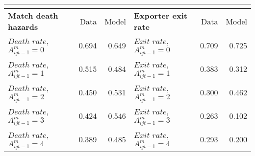 \documentclass[notes=show]{beamer}
\begin{document}
\begin{frame}%


\begin{center}
{\small 
\begin{tabular}{lrrlrr}
\multicolumn{6}{c}{} \\ \hline\hline
\textbf{Match death hazards}      & Data  & Model & \textbf{Exporter exit rate}       & Data  & Model \\ \hline
$Death$ $rate,$ $A_{ijt-1}^{m}=0$ & 0.694 & 0.649 & $Exit$ $rate,$ $ A_{ijt-1}^{m}=0$ & 0.709 & 0.725 \\
$Death$ $rate,$ $A_{ijt-1}^{m}=1$ & 0.515 & 0.484 & $Exit$ $rate,$ $ A_{ijt-1}^{m}=1$ & 0.383 & 0.312 \\
$Death$ $rate,$ $A_{ijt-1}^{m}=2$ & 0.450 & 0.531 & $Exit$ $rate,$ $ A_{ijt-1}^{m}=2$ & 0.300 & 0.462 \\
$Death$ $rate,$ $A_{ijt-1}^{m}=3$ & 0.424 & 0.546 & $Exit$ $rate,$ $ A_{ijt-1}^{m}=3$ & 0.263 & 0.102 \\
$Death$ $rate,$ $A_{ijt-1}^{m}=4$ & 0.389 & 0.485 & $Exit$ $rate,$ $ A_{ijt-1}^{m}=4$ & 0.293 & 0.200 \\ \hline
\end{tabular}%
}
\end{center}

\end{frame}%
\end{document}
